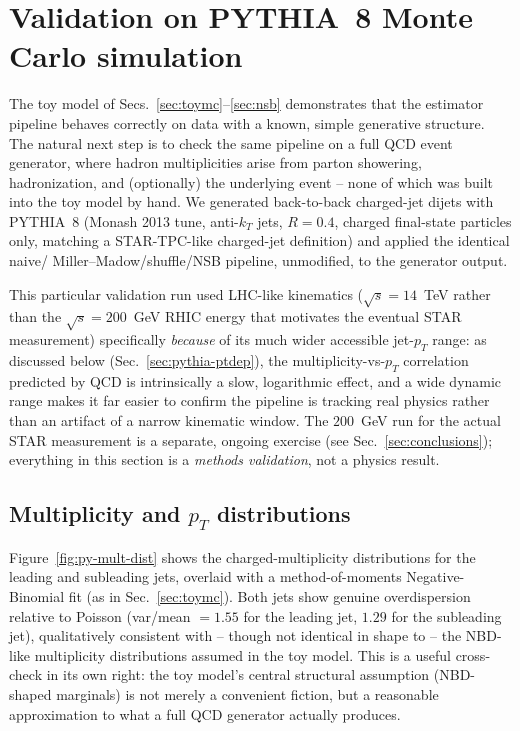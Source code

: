 \documentclass[11pt]{article}
\begin{document}
\section{Validation on PYTHIA~8 Monte Carlo simulation}
\label{sec:pythia}

The toy model of Secs.~\ref{sec:toymc}--\ref{sec:nsb} demonstrates that the
estimator pipeline behaves correctly on data with a known, simple
generative structure. The natural next step is to check the same pipeline
on a full QCD event generator, where hadron multiplicities arise from
parton showering, hadronization, and (optionally) the underlying event --
none of which was built into the toy model by hand. We generated
back-to-back charged-jet dijets with PYTHIA~8 (Monash 2013 tune,
anti-$k_T$ jets, $R=0.4$, charged final-state particles only, matching a
STAR-TPC-like charged-jet definition) and applied the identical naive/
Miller--Madow/shuffle/NSB pipeline, unmodified, to the generator output.

This particular validation run used LHC-like kinematics
($\sqrt{s}=14$~TeV rather than the $\sqrt{s}=200$~GeV RHIC energy that
motivates the eventual STAR measurement) specifically \emph{because} of
its much wider accessible jet-$p_T$ range: as discussed below
(Sec.~\ref{sec:pythia-ptdep}), the multiplicity-vs-$p_T$ correlation
predicted by QCD is intrinsically a slow, logarithmic effect, and a wide
dynamic range makes it far easier to confirm the pipeline is tracking real
physics rather than an artifact of a narrow kinematic window. The $200$~GeV
run for the actual STAR measurement is a separate, ongoing exercise (see
Sec.~\ref{sec:conclusions}); everything in this section is a
\emph{methods validation}, not a physics result.

\subsection{Multiplicity and $p_T$ distributions}

Figure~\ref{fig:py-mult-dist} shows the charged-multiplicity distributions
for the leading and subleading jets, overlaid with a method-of-moments
Negative-Binomial fit (as in Sec.~\ref{sec:toymc}). Both jets show genuine
overdispersion relative to Poisson (var/mean $=1.55$ for the leading jet,
$1.29$ for the subleading jet), qualitatively consistent with -- though
not identical in shape to -- the NBD-like multiplicity distributions
assumed in the toy model. This is a useful cross-check in its own right:
the toy model's central structural assumption (NBD-shaped marginals) is
not merely a convenient fiction, but a reasonable approximation to what a
full QCD generator actually produces.
\end{document}
